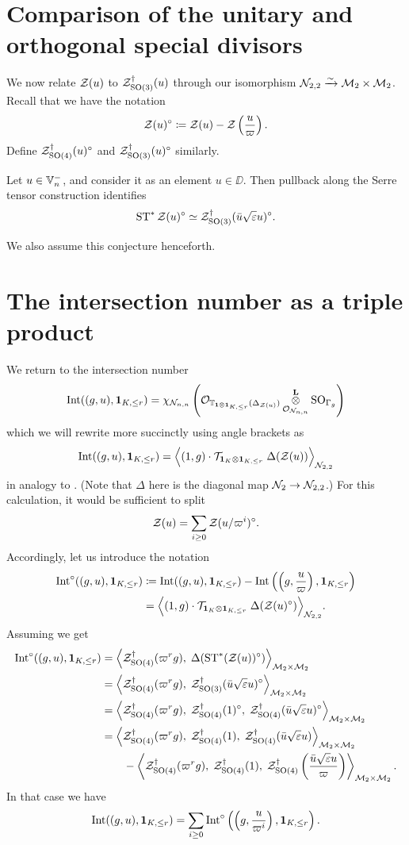 \section{Comparison of the unitary and orthogonal special divisors}
We now relate $\ZD(u)$ to $\ZO3(u)$ through our
isomorphism $\RZ_{2,2} \xrightarrow{\sim} \MM_2 \times \MM_2$.
Recall that we have the notation
\[ \ZD(u)^\circ \coloneqq \ZD(u) - \ZD\left( \frac{u}{\varpi} \right). \]
Define $\ZO4(u)^\circ$ and $\ZO3(u)^\circ$ similarly.

\begin{conjecture}
  \label{conj:serre_pullback_divisor}
  Let $u \in \VV_n^-$, and consider it as an element $u \in \DD$.
  Then pullback along the Serre tensor construction identifies
  \[ \Serre^\ast \ZD(u)^\circ \simeq \ZO3(\bar u \sqrt{\eps} u)^\circ. \]
\end{conjecture}
We also assume this conjecture henceforth.

\section{The intersection number as a triple product}
We return to the intersection number
\[ \Int((g,u), \fr) = \chi_{\RZ_{n,n}} \left(
      \Sheaf_{\TT_{\mathbf{1} \otimes \fr}(\Delta_{\ZD(u)})}
      \jiao_{\Sheaf_{\RZ_{n,n}}} \SO_{\Gamma_g} \right) \]
which we will rewrite more succinctly using angle brackets as
\[ \Int((g,u), \fr) = \Big\langle (1,g) \cdot \TTr \; \Delta(\ZD(u)) \Big\rangle_{\RZ_{2,2}} \]
in analogy to \cite[\S6.1]{ref:AFLspherical}.
(Note that $\Delta$ here is the diagonal map $\RZ_2 \to \RZ_{2,2}$.)
For this calculation, it would be sufficient to split
\[ \ZD(u) = \sum_{i \ge 0} \ZD(u/\varpi^i)^\circ. \]
Accordingly, let us introduce the notation
\begin{align*}
  \Int^\circ((g,u), \fr)
  &\coloneqq \Int((g,u), \fr) - \Int\left( \left( g, \frac{u}{\varpi} \right), \fr \right) \\
  &= \Big\langle (1,g) \cdot \TTr \; \Delta(\ZD(u)^\circ) \Big\rangle_{\RZ_{2,2}}.
\end{align*}
Assuming  we get
\begin{align*}
  \Int^\circ((g,u), \fr)
  &= \left< \ZO4(\varpi^r g), \; \Delta(\Serre^\ast(\ZD(u))^\circ) \right>_{\MM_2 \times \MM_2} \\
  &= \left< \ZO4(\varpi^r g), \; \ZO3(\bar u \sqrt{\eps} u)^\circ \right>_{\MM_2 \times \MM_2} \\
  &= \left< \ZO4(\varpi^r g), \; \ZO4(1)^\circ, \; \ZO4(\bar u \sqrt{\eps} u)^\circ \right>_{\MM_2 \times \MM_2} \\
  &= \left< \ZO4(\varpi^r g), \; \ZO4(1), \; \ZO4(\bar u \sqrt{\eps} u) \right>_{\MM_2 \times \MM_2} \\
  &\qquad- \left< \ZO4(\varpi^r g), \; \ZO4(1), \; \ZO4\left( \frac{\bar u \sqrt{\eps} u}{\varpi} \right) \right>_{\MM_2 \times \MM_2}.
\end{align*}
In that case we have
\begin{equation}
  \Int((g,u), \fr)
  = \sum_{i \ge 0} \Int^\circ\left( \left( g, \frac{u}{\varpi^i} \right), \fr \right).
  \label{eq:int_to_int_circ}
\end{equation}

